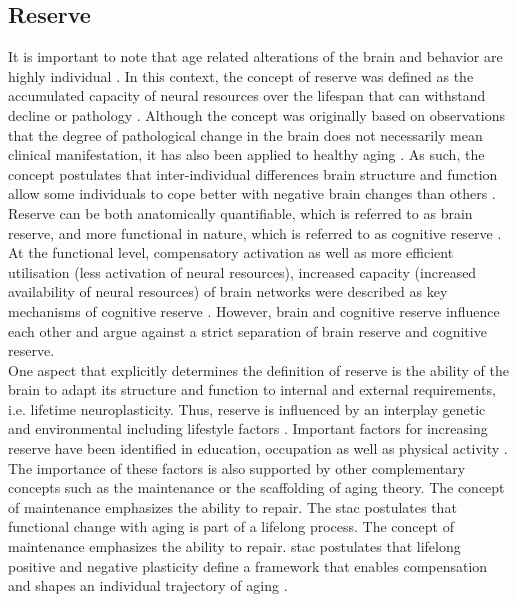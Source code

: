 \subsection{Reserve}
\label{theory:aging:reserve}
It is important to note that age related alterations of the brain and behavior are  highly individual \cite{Smith2020,Koen2019,Douw2014}. In this context, the concept of reserve was defined as the accumulated capacity of neural resources over the lifespan that can withstand decline or pathology \cite{Cabeza2018, Stern2009}. Although the concept was originally based on observations that the degree of pathological change in the brain does not necessarily mean clinical manifestation, it has also been applied to healthy aging \cite{Esiri2001,Cabeza2018,Stern2009}. As such, the concept postulates that inter-individual differences brain structure and function allow some individuals to cope better with negative brain changes than others \cite{Stern2009}.\\
Reserve can be both anatomically quantifiable, which is referred to as brain reserve, and more functional in nature, which is referred to as cognitive reserve \cite{Stern2009}. At the functional level, compensatory activation as well as more efficient utilisation (less activation of neural resources), increased capacity (increased availability of neural resources) of brain networks were described as key mechanisms of cognitive reserve \cite{Stern2004,Stern2009}. However, brain and cognitive reserve influence each other and \citeauthor{Cabeza2018} \cite{Cabeza2018} argue against a strict separation of brain reserve and cognitive reserve.\\
One aspect that explicitly determines the definition of reserve is the ability of the brain to adapt its structure and function to internal and external requirements, i.e. lifetime neuroplasticity. Thus, reserve is influenced by an interplay genetic and environmental including lifestyle factors \cite{Cabeza2018}. Important factors for increasing reserve have been identified in education, occupation as well as physical activity \cite{Cabeza2018,Stern2009}.
The importance of these factors is also supported by other complementary concepts such as the maintenance or the scaffolding of aging theory. The concept of maintenance emphasizes the ability to repair. The \gls{stac} postulates that functional change with aging is part of a lifelong process. The concept of maintenance emphasizes the ability to repair. \Gls{stac} postulates that lifelong positive and negative plasticity define a framework that enables compensation and shapes an individual trajectory of aging \cite{Reuter-Lorenz2014}.


